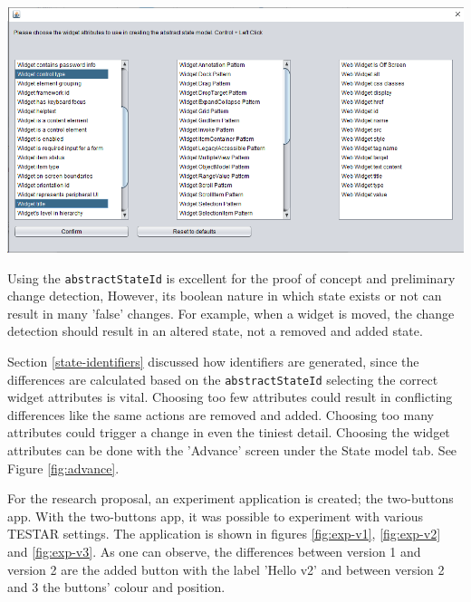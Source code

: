 \begingroup
\captionsetup{type=figure}
\includegraphics[scale=0.5]{images/attributes-state-model.png}
\label{fig:advance}
\endgroup

Using the \verb|abstractStateId| is excellent for the proof of concept and preliminary change detection, 
However, its boolean nature in which state exists or not can result in many 'false' changes. For example, when a widget is moved, the change detection should result in an altered state, not a removed and added state. 

Section \ref{state-identifiers} discussed how identifiers are generated, since the differences are calculated based on the \verb|abstractStateId| selecting the correct widget attributes is vital. Choosing too few attributes could result in conflicting differences like the same actions are removed and added. Choosing too many attributes could trigger a change in even the tiniest detail. Choosing the widget attributes can be done with the 'Advance' screen under the State model tab. See Figure \ref{fig:advance}.

For the research proposal, an experiment application is created; the two-buttons app. With the two-buttons app, it was possible to experiment with various TESTAR settings. The application is shown in figures \ref{fig:exp-v1}, \ref{fig:exp-v2} and \ref{fig:exp-v3}. As one can observe, the differences between version 1 and version 2 are the added button with the label 'Hello v2' and between version 2 and 3 the buttons' colour and position. 

